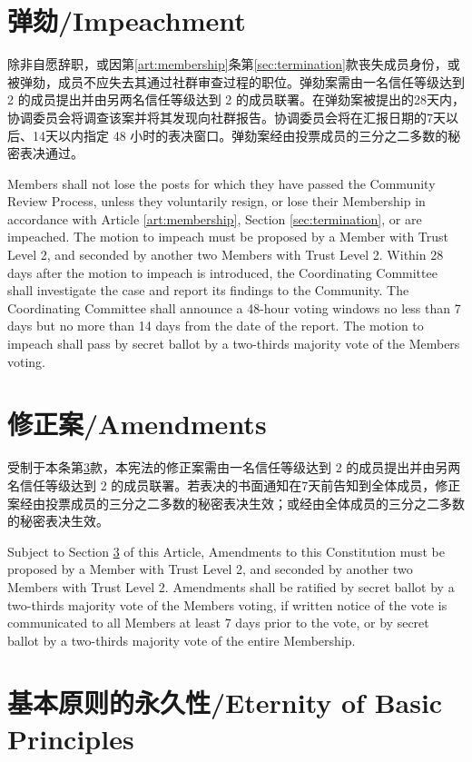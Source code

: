 \documentclass[12pt]{aspasia-constitution}
\begin{document}
	\section{弹劾/Impeachment} \label{sec:impeachment}
	
	除非自愿辞职，或因第\ref{art:membership}条第\ref{sec:termination}款丧失成员身份，或被弹劾，成员不应失去其通过社群审查过程的职位。弹劾案需由一名信任等级达到 2 的成员提出并由另两名信任等级达到 2 的成员联署。在弹劾案被提出的28天内，协调委员会将调查该案并将其发现向社群报告。协调委员会将在汇报日期的7天以后、14天以内指定 48 小时的表决窗口。弹劾案经由投票成员的三分之二多数的秘密表决通过。
	
	Members shall not lose the posts for which they have passed the Community Review Process, unless they voluntarily resign, or lose their Membership in accordance with Article \ref{art:membership}, Section \ref{sec:termination}, or are impeached. The motion to impeach must be proposed by a Member with Trust Level 2, and seconded by another two Members with Trust Level 2. Within 28 days after the motion to impeach is introduced, the Coordinating Committee shall investigate the case and report its findings to the Community. The Coordinating Committee shall announce a 48-hour voting windows no less than 7 days but no more than 14 days from the date of the report. The motion to impeach shall pass by secret ballot by a two-thirds majority vote of the Members voting.
	
	\section{修正案/Amendments} \label{sec:amendments}
	
	受制于本条第\ref{sec:eternity}款，本宪法的修正案需由一名信任等级达到 2 的成员提出并由另两名信任等级达到 2 的成员联署。若表决的书面通知在7天前告知到全体成员，修正案经由投票成员的三分之二多数的秘密表决生效；或经由全体成员的三分之二多数的秘密表决生效。
	
	Subject to Section \ref{sec:eternity} of this Article, Amendments to this Constitution must be proposed by a Member with Trust Level 2, and seconded by another two Members with Trust Level 2. Amendments shall be ratified by secret ballot by a two-thirds majority vote of the Members voting, if written notice of the vote is communicated to all Members at least 7 days prior to the vote, or by secret ballot by a two-thirds majority vote of the entire Membership.
	
	\section{基本原则的永久性/Eternity of Basic Principles} \label{sec:eternity}
	
\end{document}
